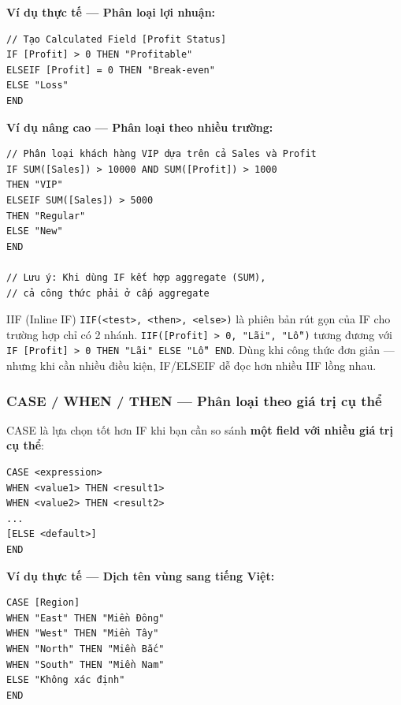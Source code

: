 \documentclass[12pt]{article}
\begin{document}
\noindent \textbf{Ví dụ thực tế --- Phân loại lợi nhuận:}

\begin{aivncodebox}[]
\begin{lstlisting}
// Tạo Calculated Field [Profit Status]
IF [Profit] > 0 THEN "Profitable"
ELSEIF [Profit] = 0 THEN "Break-even"
ELSE "Loss"
END
\end{lstlisting}
\end{aivncodebox}

\noindent \textbf{Ví dụ nâng cao --- Phân loại theo nhiều trường:}

\begin{aivncodebox}[]
\begin{lstlisting}
// Phân loại khách hàng VIP dựa trên cả Sales và Profit
IF SUM([Sales]) > 10000 AND SUM([Profit]) > 1000
THEN "VIP"
ELSEIF SUM([Sales]) > 5000
THEN "Regular"
ELSE "New"
END

// Lưu ý: Khi dùng IF kết hợp aggregate (SUM),
// cả công thức phải ở cấp aggregate
\end{lstlisting}
\end{aivncodebox}

\begin{conceptbox}{IIF (Inline IF)}
\texttt{IIF(<test>, <then>, <else>)} là phiên bản rút gọn của IF cho trường hợp chỉ có 2 nhánh. \texttt{IIF([Profit] > 0, "Lãi", "Lỗ")} tương đương với \texttt{IF [Profit] > 0 THEN "Lãi" ELSE "Lỗ" END}. Dùng khi công thức đơn giản --- nhưng khi cần nhiều điều kiện, IF/ELSEIF dễ đọc hơn nhiều IIF lồng nhau.
\end{conceptbox}

\subsubsection{CASE / WHEN / THEN --- Phân loại theo giá trị cụ thể}

\noindent CASE là lựa chọn tốt hơn IF khi bạn cần so sánh \textbf{một field với nhiều giá trị cụ thể}:

\begin{aivncodebox}[]
\begin{lstlisting}
CASE <expression>
WHEN <value1> THEN <result1>
WHEN <value2> THEN <result2>
...
[ELSE <default>]
END
\end{lstlisting}
\end{aivncodebox}

\noindent \textbf{Ví dụ thực tế --- Dịch tên vùng sang tiếng Việt:}

\begin{aivncodebox}[]
\begin{lstlisting}
CASE [Region]
WHEN "East" THEN "Miền Đông"
WHEN "West" THEN "Miền Tây"
WHEN "North" THEN "Miền Bắc"
WHEN "South" THEN "Miền Nam"
ELSE "Không xác định"
END
\end{lstlisting}
\end{aivncodebox}
\end{document}
